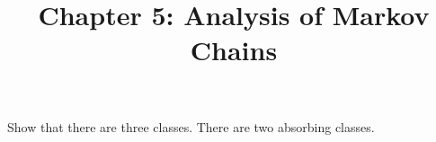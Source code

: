 \documentclass{article}
\title{Chapter 5: Analysis of Markov Chains}
\begin{document}
\maketitle
\begin{enumerate}
     Show that there are three classes. There are two absorbing classes.

\end{enumerate}
\end{document}
